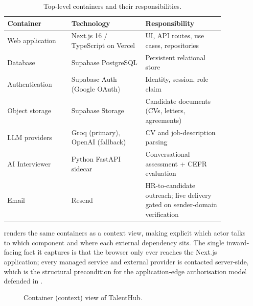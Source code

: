 \begin{table}[ht]
\centering
\caption[System containers]{Top-level containers and their responsibilities.}
\label{tab:containers}
\small
\begin{tabular}{p{0.26\linewidth}p{0.30\linewidth}p{0.32\linewidth}}
\toprule
\textbf{Container} & \textbf{Technology} & \textbf{Responsibility} \\
\midrule
Web application & Next.js 16 / TypeScript on Vercel & UI, API routes, use cases, repositories \\
Database & Supabase PostgreSQL & Persistent relational store \\
Authentication & Supabase Auth (Google OAuth) & Identity, session, role claim \\
Object storage & Supabase Storage & Candidate documents (CVs, letters, agreements) \\
LLM providers & Groq (primary), OpenAI (fallback) & CV and job-description parsing \\
AI Interviewer & Python FastAPI sidecar & Conversational assessment + CEFR evaluation \\
Email & Resend & HR-to-candidate outreach; live delivery gated on sender-domain verification \\
\bottomrule
\end{tabular}
\end{table}

 renders the same containers as a context view,
making explicit which actor talks to which component and where each external
dependency sits. The single inward-facing fact it captures is that the
browser only ever reaches the Next.js application; every managed service and
external provider is contacted server-side, which is the structural
precondition for the application-edge authorisation model defended in
.

\begin{figure}[ht]
\centering
{}
\caption[Container view]{Container (context) view of TalentHub.}
\label{fig:c4-container}
\end{figure}

